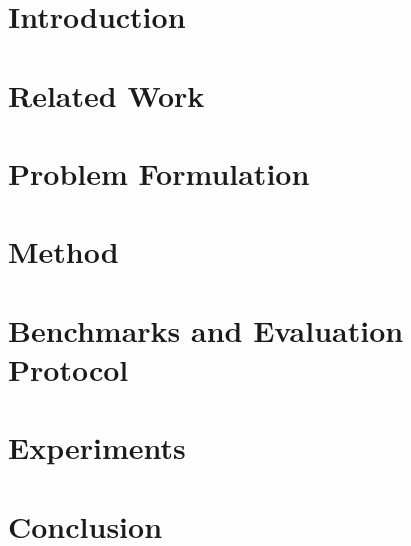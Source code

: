 \documentclass[runningheads]{llncs}
\begin{document}
\section{Introduction}
\label{sec:intro}


\section{Related Work}
\label{sec:related}


\section{Problem Formulation}
\label{sec:problem}


\section{Method}
\label{sec:method}


\section{Benchmarks and Evaluation Protocol}
\label{sec:benchmarks}


\section{Experiments}
\label{sec:experiments}


\section{Conclusion}
\label{sec:conclusion}





\end{document}
